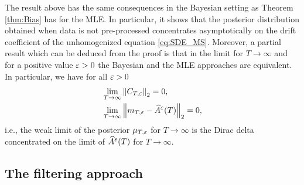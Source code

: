 \documentclass[10pt]{article}
\begin{document}
\begin{remark} The result above has the same consequences in the Bayesian setting as Theorem \ref{thm:Bias} has for the MLE. In particular, it shows that the posterior distribution obtained when data is not pre-processed concentrates asymptotically on the drift coefficient of the unhomogenized equation \eqref{eq:SDE_MS}. Moreover, a partial result which can be deduced from the proof is that in the limit for $T \to \infty$ and for a positive value $\varepsilon > 0$ the Bayesian and the MLE approaches are equivalent. In particular, we have for all $\varepsilon > 0$
	\begin{equation}
	\begin{aligned}
		&\lim_{T\to\infty} \left\|C_{T,\varepsilon}\right\|_2 = 0,\\
		&\lim_{T \to\infty}\left\|m_{T,\varepsilon} - \widehat A^\varepsilon(T)\right\|_2 =0,
	\end{aligned}	
	\end{equation} 
	i.e., the weak limit of the posterior $\mu_{T,\varepsilon}$ for $T\to \infty$ is the Dirac delta concentrated on the limit of $\widehat A^\varepsilon(T)$ for $T\to \infty$. 
\end{remark}

\subsection{The filtering approach}\label{sec:BayesianFilter}
\end{document}
